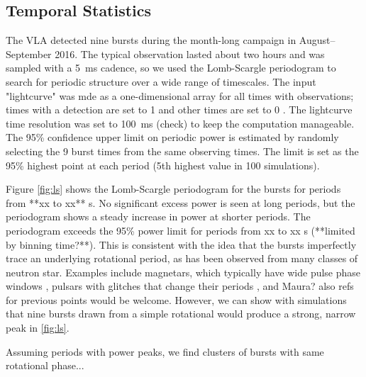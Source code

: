 \documentclass[twocolumn]{aastex61}
\begin{document}
\subsection{Temporal Statistics}
The VLA detected nine bursts during the month-long campaign in August--September 2016. The typical observation lasted about two hours and was sampled with a 5~ms cadence, so we used the Lomb-Scargle periodogram \citep{} to search for periodic structure over a wide range of timescales. The input "lightcurve" was mde as a one-dimensional array for all times with observations; times with a detection are set to 1 and other times are set to 0 \citep[see also]{2011MNRAS.417.1871P}. The lightcurve time resolution was set to {\color{red} 100~ms (check)} to keep the computation manageable. The 95\% confidence upper limit on periodic power is estimated by randomly selecting the 9 burst times from the same observing times. The limit is set as the 95\% highest point at each period (5th highest value in 100 simulations).

Figure \ref{fig:ls} shows the Lomb-Scargle periodogram for the bursts for periods from **xx to xx** s. No significant excess power is seen at long periods, but the periodogram shows a steady increase in power at shorter periods. The periodogram exceeds the 95\% power limit for periods from xx to xx s (**limited by binning time?**). This is consistent with the idea that the bursts imperfectly trace an underlying rotational period, as has been observed from many classes of neutron star. Examples include magnetars, which typically have wide pulse phase windows \citep{}, pulsars with glitches that change their periods \citep{}, and {\color{red} Maura? also refs for previous points would be welcome}. However, we can show with simulations that nine bursts drawn from a simple rotational would produce a strong, narrow peak in \ref{fig:ls}.

Assuming periods with power peaks, we find clusters of bursts with same rotational phase...
\end{document}
